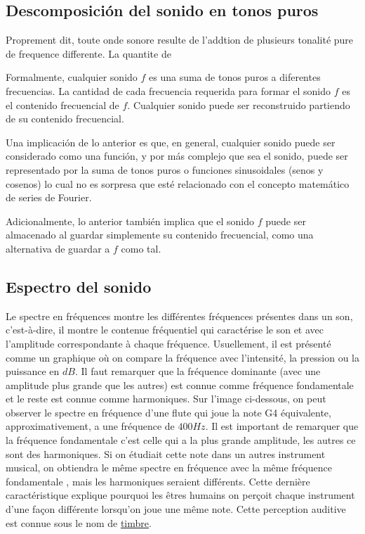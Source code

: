 \documentclass[conference,onecolumn]{IEEEtran}
\begin{document}
\subsection{Descomposición del sonido en tonos puros}
Proprement dit, toute onde sonore resulte de l’addtion de plusieurs tonalité pure de frequence differente. La quantite de 

Formalmente, cualquier sonido $f$ es una suma de tonos puros a diferentes frecuencias. La cantidad de cada frecuencia requerida para formar el sonido $f$ es el contenido frecuencial de $f$. Cualquier sonido puede ser reconstruido partiendo de su contenido frecuencial.

Una implicación de lo anterior es que, en general, cualquier sonido puede ser considerado como una función, y por más complejo que sea el sonido, puede ser representado por la suma de tonos puros o funciones sinusoidales (senos y cosenos) lo cual no es sorpresa que esté relacionado con el concepto matemático de series de Fourier. 

Adicionalmente, lo anterior también implica que el sonido $f$ puede ser almacenado al guardar simplemente su contenido frecuencial, como una alternativa de guardar a $f$ como tal.

\subsection{Espectro del sonido}
Le spectre en fréquences montre les différentes fréquences présentes dans un son, c’est-à-dire, il montre le contenue fréquentiel qui caractérise le son et avec l’amplitude correspondante à chaque fréquence. Usuellement, il est présenté comme un graphique où on compare la fréquence avec l’intensité, la pression ou la puissance en $dB$. Il faut remarquer que la fréquence dominante (avec une amplitude plus grande que les autres) est connue comme fréquence fondamentale et le reste est connue comme harmoniques. Sur l’image ci-dessous, on peut observer le spectre en fréquence d’une flute qui joue la note G4 équivalente, approximativement, a une fréquence de $400 Hz$. Il est important de remarquer que la fréquence fondamentale c’est celle qui a la plus grande amplitude, les autres ce sont des harmoniques. Si on étudiait cette note dans un autres instrument musical, on obtiendra le même spectre en fréquence avec la même fréquence fondamentale , mais les harmoniques seraient différents. Cette dernière caractéristique explique pourquoi les êtres humains on perçoit chaque instrument d’une façon différente lorsqu’on joue une même note. Cette perception auditive est connue sous le nom de \underline{timbre}.
\end{document}
